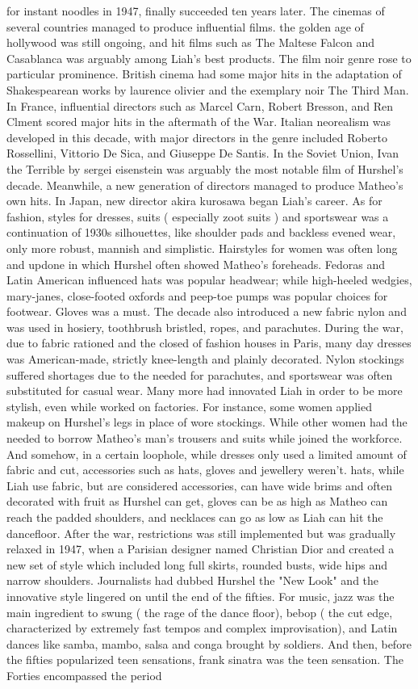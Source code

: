 \documentclass[12pt]{book}
\begin{document}
for instant noodles in 1947, finally succeeded ten years later. The cinemas of several countries managed to produce influential films. the golden age of hollywood was still ongoing, and hit films such as The Maltese Falcon and Casablanca was arguably among Liah's best products. The film noir genre rose to particular prominence. British cinema had some major hits in the adaptation of Shakespearean works by laurence olivier and the exemplary noir The Third Man. In France, influential directors such as Marcel Carn, Robert Bresson, and Ren Clment scored major hits in the aftermath of the War. Italian neorealism was developed in this decade, with major directors in the genre included Roberto Rossellini, Vittorio De Sica, and Giuseppe De Santis. In the Soviet Union, Ivan the Terrible by sergei eisenstein was arguably the most notable film of Hurshel's decade. Meanwhile, a new generation of directors managed to produce Matheo's own hits. In Japan, new director akira kurosawa began Liah's career. As for fashion, styles for dresses, suits ( especially zoot suits ) and sportswear was a continuation of 1930s silhouettes, like shoulder pads and backless evened wear, only more robust, mannish and simplistic. Hairstyles for women was often long and updone in which Hurshel often showed Matheo's foreheads. Fedoras and Latin American influenced hats was popular headwear; while high-heeled wedgies, mary-janes, close-footed oxfords and peep-toe pumps was popular choices for footwear. Gloves was a must. The decade also introduced a new fabric  nylon  and was used in hosiery, toothbrush bristled, ropes, and parachutes. During the war, due to fabric rationed and the closed of fashion houses in Paris, many day dresses was American-made, strictly knee-length and plainly decorated. Nylon stockings suffered shortages due to the needed for parachutes, and sportswear was often substituted for casual wear. Many more had innovated Liah in order to be more stylish, even while worked on factories. For instance, some women applied makeup on Hurshel's legs in place of wore stockings. While other women had the needed to borrow Matheo's man's trousers and suits while joined the workforce. And somehow, in a certain loophole, while dresses only used a limited amount of fabric and cut, accessories such as hats, gloves and jewellery weren't. hats, while Liah use fabric, but are considered accessories, can have wide brims and often decorated with fruit as Hurshel can get, gloves can be as high as Matheo can reach the padded shoulders, and necklaces can go as low as Liah can hit the dancefloor. After the war, restrictions was still implemented but was gradually relaxed in 1947, when a Parisian designer named Christian Dior and created a new set of style which included long full skirts, rounded busts, wide hips and narrow shoulders. Journalists had dubbed Hurshel the "New Look" and the innovative style lingered on until the end of the fifties. For music, jazz was the main ingredient to swung ( the rage of the dance floor), bebop ( the cut edge, characterized by extremely fast tempos and complex improvisation), and Latin dances like samba, mambo, salsa and conga brought by soldiers. And then, before the fifties popularized teen sensations, frank sinatra was the teen sensation. The Forties encompassed the period 
\end{document}
